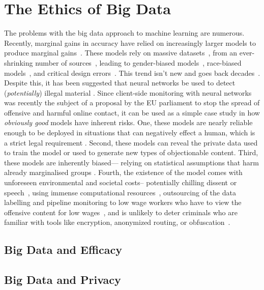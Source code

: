 \section{The Ethics of Big Data}
\label{sec:ethics}
The problems with the big data approach to machine learning are numerous. 
Recently, marginal gains in accuracy have relied on increasingly larger models to produce marginal gains~\cite{desislavov2021compute}. 
These models rely on massive datasets~\cite{desislavov2021compute,vapnik1994measuring,blumer1989learnability}, from an ever-shrinking number of sources~\cite{koch2021reduced}, leading to gender-biased models~\cite{lu2020gender}, race-biased models~\cite{buolamwini2018gender}, and critical design errors~\cite{banks2018driver}. 
This trend isn't new and goes back decades~\cite{corsaro1982something,ramirez2000resource,buolamwini2018gender}. 
Despite this, it has been suggested that neural networks be used to detect (\textit{potentially}) illegal material \cite{abelson2021bugs}. Since client-side monitoring with neural networks was recently the subject of a proposal by the EU parliament to stop the spread of offensive and harmful online contact, it can be used as a simple case study in how \textit{obviously good} models have inherent risks.
One, these models are nearly reliable enough to be deployed in situations that can negatively effect a human, which is a strict legal requirement \cite{iso26262}. 
Second, these models can reveal the private data used to train the model \cite{chakraborty_adversarial_2018} or used to generate new types of objectionable content.
Third, these models are inherently biased--- relying on statistical assumptions that harm already marginalised groups \cite{buolamwini2018gender}. 
Fourth, the existence of the model comes with unforeseen environmental and societal costs-- potentially chilling dissent or speech~\cite{}, using immense computational resources~\cite{}, outsourcing of the data labelling and pipeline monitoring to low wage workers who have to view the offensive content for low wages~\cite{}, and is unlikely to deter criminals who are familiar with tools like encryption, anonymized routing, or obfuscation~\cite{}.

\subsection{Big Data and Efficacy}
\lipsum[1]
\subsection{Big Data and Privacy}
\label{subsec:privacy}
\lipsum[1]
